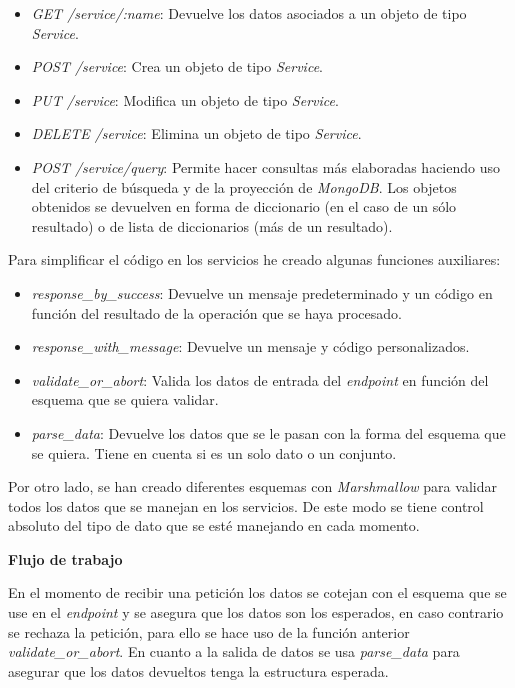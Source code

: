 \begin{itemize}
	\item \textit{GET /service/:name}: Devuelve los datos asociados a un objeto de tipo \textit{Service}.
	\item \textit{POST /service}: Crea un objeto de tipo \textit{Service}.
	\item \textit{PUT /service}: Modifica un objeto de tipo \textit{Service}.
	\item \textit{DELETE /service}: Elimina un objeto de tipo \textit{Service}.
	\item \textit{POST /service/query}: Permite hacer consultas más elaboradas haciendo uso del criterio de búsqueda y de la proyección de \textit{MongoDB}. Los objetos obtenidos se devuelven en forma de diccionario (en el caso de un sólo resultado) o de lista de diccionarios (más de un resultado).
\end{itemize}


\bigskip
Para simplificar el código en los servicios he creado algunas funciones auxiliares:
\begin{itemize}
	\item \textit{response\_by\_success}: Devuelve un mensaje predeterminado y un código en función del resultado de la operación que se haya procesado.
	\item \textit{response\_with\_message}: Devuelve un mensaje y código personalizados.
	\item \textit{validate\_or\_abort}: Valida los datos de entrada del \textit{endpoint} en función del esquema que se quiera validar.
	\item \textit{parse\_data}: Devuelve los datos que se le pasan con la forma del esquema que se quiera. Tiene en cuenta si es un solo dato o un conjunto.
\end{itemize}

Por otro lado, se han creado diferentes esquemas con \textit{Marshmallow} para validar todos los datos que se manejan en los servicios. De este modo se tiene control absoluto del tipo de dato que se esté manejando en cada momento.

\bigskip
\textbf{Flujo de trabajo}

En el momento de recibir una petición los datos se cotejan con el esquema que se use en el \textit{endpoint} y se asegura que los datos son los esperados, en caso contrario se rechaza la petición, para ello se hace uso de la función anterior \textit{validate\_or\_abort}. En cuanto a la salida de datos se usa \textit{parse\_data} para asegurar que los datos devueltos tenga la estructura esperada.

